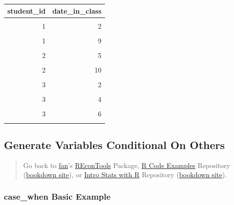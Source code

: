 \documentclass[
]{book}
\begin{document}
\begin{table}[!h]
\centering
\begin{tabular}{r|r}
\hline
student\_id & date\_in\_class\\
\hline
\cellcolor{gray!6}{1} & \cellcolor{gray!6}{1}\\
\hline
1 & 2\\
\hline
\cellcolor{gray!6}{1} & \cellcolor{gray!6}{8}\\
\hline
1 & 9\\
\hline
\cellcolor{gray!6}{1} & \cellcolor{gray!6}{10}\\
\hline
2 & 5\\
\hline
\cellcolor{gray!6}{2} & \cellcolor{gray!6}{8}\\
\hline
2 & 10\\
\hline
\cellcolor{gray!6}{3} & \cellcolor{gray!6}{1}\\
\hline
3 & 2\\
\hline
\cellcolor{gray!6}{3} & \cellcolor{gray!6}{3}\\
\hline
3 & 4\\
\hline
\cellcolor{gray!6}{3} & \cellcolor{gray!6}{5}\\
\hline
3 & 6\\
\hline
\cellcolor{gray!6}{3} & \cellcolor{gray!6}{9}\\
\hline
\end{tabular}
\end{table}

\hypertarget{generate-variables-conditional-on-others}{%
\subsection{Generate Variables Conditional On Others}\label{generate-variables-conditional-on-others}}

\begin{quote}
Go back to \href{http://fanwangecon.github.io/}{fan}'s \href{https://fanwangecon.github.io/REconTools/}{REconTools} Package, \href{https://fanwangecon.github.io/R4Econ/}{R Code Examples} Repository (\href{https://fanwangecon.github.io/R4Econ/bookdown}{bookdown site}), or \href{https://fanwangecon.github.io/Stat4Econ/}{Intro Stats with R} Repository (\href{https://fanwangecon.github.io/Stat4Econ/bookdown}{bookdown site}).
\end{quote}

\hypertarget{case_when-basic-example}{%
\subsubsection{case\_when Basic Example}\label{case_when-basic-example}}
\end{document}
